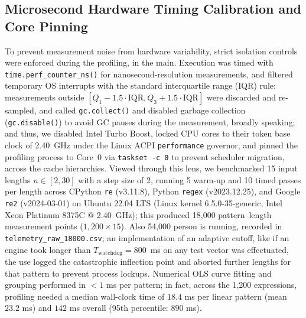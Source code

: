 \documentclass{ieeeaccess}
\begin{document}
\subsection{Microsecond Hardware Timing Calibration and Core Pinning}
To prevent measurement noise from hardware variability, strict isolation controls were enforced during the profiling, in the main. Execution was timed with \texttt{time.perf\_counter\_ns()} for nanosecond-resolution measurements, and filtered temporary OS interrupts with the standard interquartile range (IQR) rule: measurements outside $[Q_1 - 1.5 \cdot \mathrm{IQR}, Q_3 + 1.5 \cdot \mathrm{IQR}]$ were discarded and re-sampled, and called \texttt{gc.collect()} and disabled garbage collection (\texttt{gc.disable()}) to avoid GC pauses during the measurement, broadly speaking; and thus, we disabled Intel Turbo Boost, locked CPU cores to their token base clock of 2.40~GHz under the Linux ACPI \texttt{performance} governor, and pinned the profiling process to Core~0 via \texttt{taskset -c 0} to prevent scheduler migration, across the cache hierarchies. Viewed through this lens, we benchmarked 15 input lengths $n \in [2, 30]$ with a step size of 2, running 5 warm-up and 10 timed passes per length across CPython \texttt{re} (v3.11.8), Python \texttt{regex} (v2023.12.25), and Google \texttt{re2} (v2024-03-01) on Ubuntu 22.04 LTS (Linux kernel 6.5.0-35-generic, Intel Xeon Platinum 8375C @ 2.40~GHz); this produced 18,000 pattern--length measurement points ($1{,}200 \times 15$). Also 54,000 person is running, recorded in \texttt{telemetry\_raw\_18000.csv}; an implementation of an adaptive cutoff, like if an engine took longer than $T_{\mathrm{watchdog}} = 800$~ms on any test vector was effectuated, the use logged the catastrophic inflection point and aborted further lengths for that pattern to prevent process lockups. Numerical OLS curve fitting and grouping performed in $<1$ ms per pattern; in fact, across the 1,200 expressions, profiling needed a median wall-clock time of $18.4$ ms per linear pattern (mean $23.2$ ms) and $142$ ms overall (95th percentile: $890$ ms).
\end{document}
